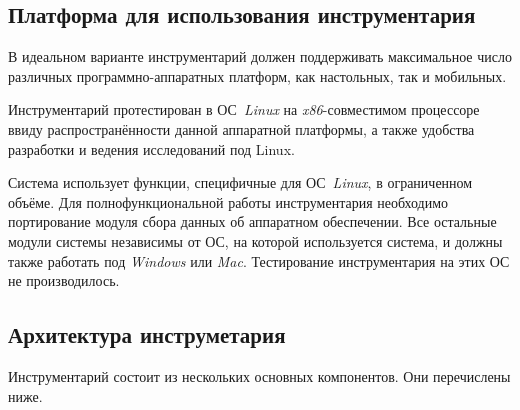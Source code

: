 \subsection{Платформа для использования инструментария}
В идеальном варианте инструментарий должен поддерживать максимальное число различных программно-аппаратных платформ, как настольных, так и мобильных.

Инструментарий протестирован в ОС~\textit{Linux} на \textit{x86}-совместимом процессоре ввиду распространённости данной аппаратной платформы, а также удобства разработки и ведения исследований под Linux.

Система использует функции, специфичные для ОС~\textit{Linux}, в ограниченном объёме. Для полнофункциональной работы инструментария необходимо портирование модуля сбора данных об аппаратном обеспечении. Все остальные модули системы независимы от ОС, на которой используется система, и должны также работать под \textit{Windows} или \textit{Mac}. Тестирование инструментария на этих ОС не производилось.


\subsection{Архитектура инструметария}
Инструментарий состоит из нескольких основных компонентов. Они перечислены ниже.

